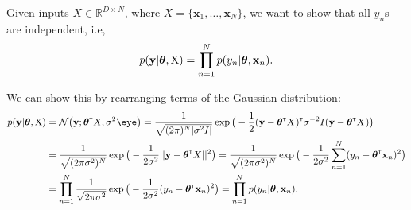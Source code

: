 Given inputs $X\in\mathbb{R}^{D\times N}$, where $X=\{\textbf{x}_1, \dots, \textbf{x}_N\}$, we want to show that all $y_n$s are independent, i.e,
\begin{align}
p(\mathbf{y}|\boldsymbol{\theta},{\mathrm{{X}}}) = \prod_{n=1}^N p(y_n|\boldsymbol{\theta},\textbf{x}_n).
\end{align}

We can show this by rearranging terms of the Gaussian distribution:
\begin{align}
p(\vy|\vtheta,\mat X) &= \NormDist{\vy; \vtheta\transpose X, \sigma^2 \eye} = \frac{1}{\sqrt{(2\pi)^N|\sigma^2 I|}}\exp\big(-\frac{1}{2}(\textbf{y} - \vtheta\transpose X)\transpose\sigma^{-2}I (\textbf{y} - \vtheta\transpose X)\big) \\
&= \frac{1}{\sqrt{(2\pi\sigma^2)^N}}\exp\big(-\frac{1}{2\sigma^2}||\textbf{y} - \vtheta\transpose X||^2\big) = \frac{1}{\sqrt{(2\pi\sigma^2)^N}}\exp\big(-\frac{1}{2\sigma^2}\sum_{n=1}^N(y_n - \vtheta\transpose \textbf{x}_n)^2\big) \\
&= \prod_{n=1}^N \frac{1}{\sqrt{2\pi\sigma^2}}\exp\big(-\frac{1}{2\sigma^2}(y_n - \vtheta\transpose \textbf{x}_n)^2\big) = \prod_{n=1}^N p(y_n|\vtheta,\textbf{x}_n)
.\end{align}
